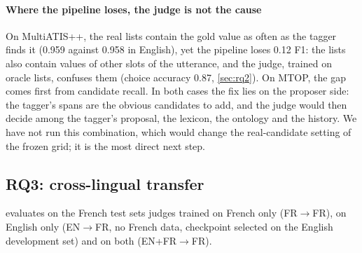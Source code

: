 \paragraph{Where the pipeline loses, the judge is not the cause} On MultiATIS++, the real lists contain the gold value as often as the tagger finds it (0.959 against 0.958 in English), yet the pipeline loses 0.12 F1: the lists also contain values of other slots of the utterance, and the judge, trained on oracle lists, confuses them (choice accuracy 0.87, \cref{sec:rq2}). On MTOP, the gap comes first from candidate recall. In both cases the fix lies on the proposer side: the tagger's spans are the obvious candidates to add, and the judge would then decide among the tagger's proposal, the lexicon, the ontology and the history. We have not run this combination, which would change the real-candidate setting of the frozen grid; it is the most direct next step.

\subsection{RQ3: cross-lingual transfer}
\label{sec:rq3}

 evaluates on the French test sets judges trained on French only (FR$\rightarrow$FR), on English only (EN$\rightarrow$FR, no French data, checkpoint selected on the English development set) and on both (EN+FR$\rightarrow$FR).

